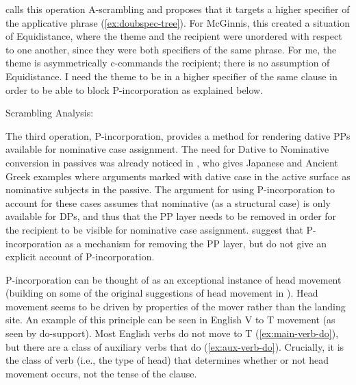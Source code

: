 \cite{McGinnis.1998} calls this operation A-scrambling and proposes that it targets a higher specifier of the applicative phrase (\ref{ex:doubspec-tree}). For McGinnis, this created a situation of Equidistance, where the theme and the recipient were unordered with respect to one another, since they were both specifiers of the same phrase. For me, the theme is asymmetrically c-commands the recipient; there is no assumption of Equidistance. I need the theme to be in a higher specifier of the same clause in order to be able to block P-incorporation as explained below. 

\begin{exe}
	\ex Scrambling Analysis:\label{ex:doubspec-tree}
 \end{exe} 

 The third operation, P-incorporation, provides a method for rendering dative PPs available for nominative case assignment. The need for Dative to Nominative conversion in passives was already noticed in \cite{Larson.1988}, who gives Japanese and Ancient Greek examples where arguments marked with dative case in the active surface as nominative subjects in the passive. The argument for using P-incorporation to account for these cases assumes that nominative (as a structural case) is only available for DPs, and thus that the PP layer needs to be removed in order for the recipient to be visible for nominative case assignment. \cite{Alexiadou.2014} suggest that P-incorporation as a mechanism for removing the PP layer, but do not give an explicit account of P-incorporation. 

 P-incorporation can be thought of as an exceptional instance of head movement (building on some of the original suggestions of head movement in \citealt{Baker.1988}). Head movement seems to be driven by properties of the mover rather than the landing site. An example of this principle can be seen in English V to T movement (as seen by do-support). Most English verbs do not move to T (\ref{ex:main-verb-do}), but there are a class of auxiliary verbs that do (\ref{ex:aux-verb-do}). Crucially, it is the class of verb (i.e., the type of head) that determines whether or not head movement occurs, not the tense of the clause.


